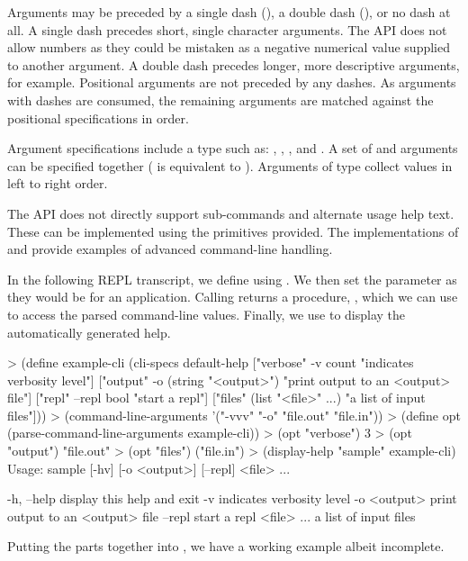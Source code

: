 Arguments may be preceded by a single dash (\sopt{}), a double
dash (\lopt{}), or no dash at all.
A single dash precedes short, single character arguments. The API does
not allow numbers as they could be mistaken as a negative numerical
value supplied to another argument. A double dash precedes longer,
more descriptive arguments,  for example.
Positional arguments are not preceded by any dashes.  As arguments
with dashes are consumed, the remaining arguments are matched against
the positional specifications in order.

Argument specifications include a type such as: ,
, , and .  A set of 
and  arguments can be specified together ( is
equivalent to   ). Arguments of type
 collect values in left to right order.

The API does not directly support sub-commands and alternate usage
help text. These can be implemented using the primitives provided. The
implementations of  and  provide
examples of advanced command-line handling.

In the following REPL transcript, we define  using
. We then set the 
parameter as they would be for an application. Calling
 returns a procedure, ,
which we can use to access the parsed command-line values. Finally, we use
 to display the automatically generated help.

\codebegin
> (define example-cli
    (cli-specs
     default-help
     ["verbose" -v count "indicates verbosity level"]
     ["output" -o (string "<output>") "print output to an <output> file"]
     ["repl" --repl bool "start a repl"]
     ["files" (list "<file>" ...) "a list of input files"]))
> (command-line-arguments '("-vvv" "-o" "file.out" "file.in"))
> (define opt (parse-command-line-arguments example-cli))
> (opt "verbose")
3
> (opt "output")
"file.out"
> (opt "files")
("file.in")
> (display-help "sample" example-cli)
Usage: sample [-hv] [-o <output>] [--repl] <file> ...

  -h, --help        display this help and exit
  -v                indicates verbosity level
  -o <output>       print output to an <output> file
  --repl            start a repl
  <file> ...        a list of input files
\codeend

Putting the parts together into , we have a working
example albeit incomplete.

